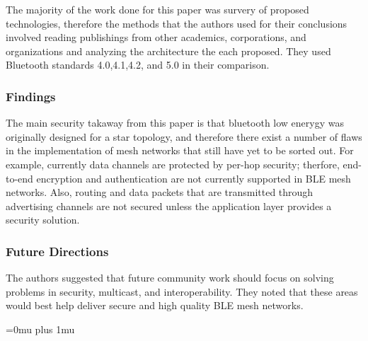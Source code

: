 \noindent
The majority of the work done for this paper was survery of proposed technologies, therefore the methods that the authors used for their conclusions involved reading publishings from other academics, corporations, and organizations and analyzing the architecture the each proposed. They used Bluetooth standards 4.0,4.1,4.2, and 5.0 in their comparison.

\subsubsection{Findings}

\noindent
The main security takaway from this paper is that bluetooth low enerygy was originally designed for a star topology, and therefore there exist a number of flaws in the implementation of mesh networks that still have yet to be sorted out. For example, currently data channels are protected by per-hop security; therfore, end-to-end encryption and authentication are not currently supported in BLE mesh networks. Also, routing and data packets that are transmitted through advertising channels are not secured unless the application layer provides a security solution.

\subsubsection{Future Directions}

\noindent
The authors suggested that future community work should focus on solving problems in security, multicast, and interoperability. They noted that these areas would best help deliver secure and high quality BLE mesh networks.

\Urlmuskip=0mu plus 1mu\relax
\pagebreak